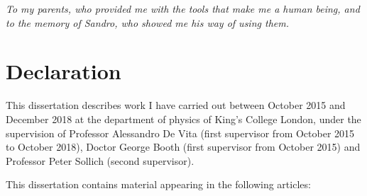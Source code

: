 
\makeatletter
\renewcommand{\@pnumwidth}{2em}
\renewcommand{\@tocrmarg}{3em}
\setlength{\cftbeforechapterskip}{.9em}
\makeatother


\thispagestyle{empty}

\begin{vplace}[0.15]

\begin{center}
\it{To my parents, who provided me with the tools that make me a human being, and to the memory of Sandro, who showed me his way of using them.}
\end{center} 

\end{vplace}




\cleardoublepage
\newpage
\thispagestyle{plain} %
\mbox{}


\thispagestyle{empty}
\chapter*{Declaration}


\noindent This dissertation describes work I have carried out between October 2015 and December 2018 at the department of physics of King's College London, under the supervision of Professor Alessandro De Vita (first supervisor from October 2015 to October 2018), Doctor George Booth (first supervisor from October 2015) and Professor Peter Sollich (second supervisor).

\vspace{.2cm}

\noindent This dissertation contains material appearing in the following articles:


